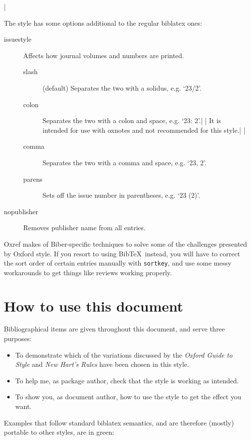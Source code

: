 \documentclass[extrafontsizes,11pt,a4paper,oneside]{memoir}
\begin{document}
\todoc|

The style has some options additional to the regular \textsf{biblatex} ones:

\begin{description}
  \item[issuestyle]
  Affects how journal volumes and numbers are printed.
  \begin{description}
  \item[slash]
  (default) Separates the two with a solidus, e.g. ‘23/2’.
  \item[colon]
  Separates the two with a colon and space, e.g. ‘23: 2’.|
\todoc[oxyear]| It is intended for use with \textsf{oxnotes} and not recommended for this style.|
\todoc|
  \item[comma]
  Separates the two with a comma and space, e.g. ‘23, 2’.
  \item[parens]
  Sets off the issue number in parentheses, e.g. ‘23 (2)’.
  \end{description}
  \item[nopublisher]
  Removes publisher name from all entries.
\end{description}

\textsf{Oxref} makes of Biber-specific techniques to solve some of the challenges
presented by Oxford style. If you resort to using Bib\TeX\ instead,
you will have to correct the sort order of certain entries manually with
\texttt{sortkey}, and use some messy workarounds to get things like reviews
working properly.

\section{How to use this document}

Bibliographical items are given throughout this document, and serve three purposes:

\begin{itemize}
  \item
  To demonstrate which of the variations discussed by the
  \emph{Oxford Guide to Style} and \emph{New Hart's Rules} have been chosen
  in this style.
  \item
  To help me, as package author, check that the style is working as intended.
  \item
  To show you, as document author, how to use the style to get the effect you want.
\end{itemize}

Examples that follow standard \textsf{biblatex} semantics, and are therefore
(mostly) portable to other styles, are in green:
\end{document}
